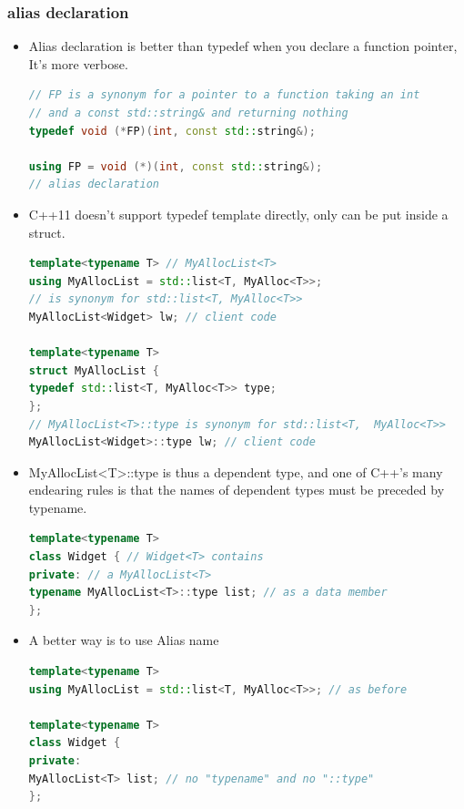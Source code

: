 \documentclass[a4paper,12pt,twoside]{book}
\begin{document}
\subsubsection{alias declaration}

\begin{itemize}
\item Alias declaration is better than typedef when you declare a function pointer, It's more verbose.
\begin{lstlisting}[frame=single, language=c++]
// FP is a synonym for a pointer to a function taking an int
// and a const std::string& and returning nothing
typedef void (*FP)(int, const std::string&);

using FP = void (*)(int, const std::string&);
// alias declaration
\end{lstlisting}

\item C++11 doesn't support typedef template directly, only can be put inside a struct.
\begin{lstlisting}[frame=single, language=c++]
template<typename T> // MyAllocList<T>
using MyAllocList = std::list<T, MyAlloc<T>>;
// is synonym for std::list<T, MyAlloc<T>>
MyAllocList<Widget> lw; // client code

template<typename T>
struct MyAllocList {
typedef std::list<T, MyAlloc<T>> type;
};
// MyAllocList<T>::type is synonym for std::list<T,  MyAlloc<T>>
MyAllocList<Widget>::type lw; // client code
\end{lstlisting}

\item MyAllocList<T>::type is thus a dependent type, and one of C++'s many endearing rules is that the names of dependent types must be preceded by typename.

\begin{lstlisting}[frame=single, language=c++]
template<typename T>
class Widget { // Widget<T> contains
private: // a MyAllocList<T>
typename MyAllocList<T>::type list; // as a data member
};
\end{lstlisting}
\item A better way is to use Alias name
\begin{lstlisting}[frame=single, language=c++]
template<typename T>
using MyAllocList = std::list<T, MyAlloc<T>>; // as before

template<typename T>
class Widget {
private:
MyAllocList<T> list; // no "typename" and no "::type"
};
\end{lstlisting}


\end{itemize}
\end{document}
